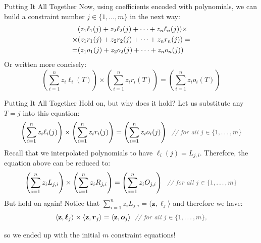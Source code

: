 \documentclass{zkdl-presentation-template}
\begin{document}
    \begin{frame}{Putting It All Together}
        \vspace{-5pt}
        Now, using coefficients encoded with polynomials, we can build a constraint number
        $j \in \{1, \dots, m\}$ in the next way:
        \vspace{-5pt}
        \begin{align*}
            &(z_1\ell_1(j) + z_2\ell_2(j) + \dots + z_n\ell_n(j)) \times \\
            \times &(z_1r_1(j) + z_2r_2(j) + \dots + z_nr_n(j)) = \\
            = &(z_1o_1(j) + z_2o_2(j) + \dots + z_no_n(j))
            \vspace{-5pt}
        \end{align*}
        \pause
        Or written more concisely:
        \vspace{-5pt}
        \begin{equation*}
            \left( \sum_{i = 1}^{n} z_i\ell_i(T) \right) \times \left( \sum_{i = 1}^{n} z_ir_i(T) \right) = \left( \sum_{i = 1}^{n} z_io_i(T) \right)
        \end{equation*}
    \end{frame}

    \begin{frame}{Putting It All Together}
        Hold on, but why does it hold? Let us substitute any $T=j$ into this equation:
        \vspace{-5pt}
        \begin{equation*}
            \left( \sum_{i = 1}^{n} z_i\ell_i(j) \right) \times \left( \sum_{i = 1}^{n} z_ir_i(j) \right) = \left( \sum_{i = 1}^{n} z_io_i(j) \right) \; \commentgray{for all $j \in \{1,\dots,m\}$}
            \vspace{-5pt}
        \end{equation*}
        \pause
        Recall that we interpolated polynomials to have $\ell_i(j) = L_{j,i}$. Therefore, the equation above can be reduced to:
        \vspace{-5pt}
        \begin{equation*}
            \left( \sum_{i = 1}^{n} z_iL_{j,i} \right) \times \left( \sum_{i = 1}^{n} z_iR_{j,i} \right) = \left( \sum_{i = 1}^{n} z_iO_{j,i} \right) \; \commentgray{for all $j \in \{1,\dots,m\}$}
            \vspace{-5pt}
        \end{equation*}
        \pause
        But hold on again! Notice that $\sum_{i = 1}^{n} z_iL_{j,i} = \langle \mathbf{z}, \boldsymbol{\ell}_j \rangle$ and therefore we have:
        \vspace{-5pt}
        \begin{equation*}
            \langle \mathbf{z}, \boldsymbol{\ell}_j \rangle \times \langle \mathbf{z}, \boldsymbol{r}_j \rangle = \langle \mathbf{z}, \boldsymbol{o}_j \rangle \; \commentgray{for all $j \in \{1,\dots,m\}$,}
            \vspace{-5pt}
        \end{equation*}

        so we ended up with the initial $m$ constraint equations!
    \end{frame}
\end{document}
